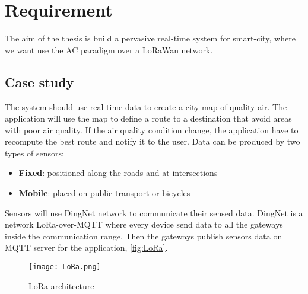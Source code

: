 \chapter{Requirement}

The aim of the thesis is build a pervasive real-time system for smart-city, where we want use the AC paradigm over a LoRaWan network.

\section{Case study}

The system should use real-time data to create a city map of quality air.
The application will use the map to define a route to a destination that avoid areas with poor air quality.
If the air quality condition change, the application have to recompute the best route and notify it to the user. 
Data can be produced by two types of sensors:
\begin{itemize}
    \item \textbf{Fixed}: positioned along the roads and at intersections
    \item \textbf{Mobile}: placed on public transport or bicycles
\end{itemize}

Sensors will use DingNet network to communicate their sensed data. DingNet is a network LoRa-over-MQTT where every device send data to all the gateways inside the communication range. Then the gateways publish sensors data on MQTT server for the application, \autoref{fig:LoRa}.

\begin{figure}[h]
    \centering
    \texttt{[image: LoRa.png]}
    \caption{LoRa architecture}
    \label{fig:LoRa}
\end{figure}